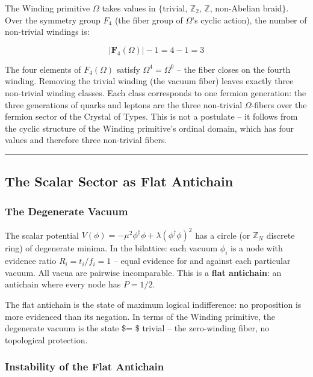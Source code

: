 The Winding primitive \(\Omega\) takes values in \(\{\)trivial,
\(\mathbb{Z}_2\), \(\mathbb{Z}\), non-Abelian braid\(\}\). Over the
symmetry group \(F_4\) (the fiber group of \(\Omega\)'s cyclic action),
the number of non-trivial windings is:

\[|\mathbf{F}_4(\Omega)| - 1 = 4 - 1 = 3\]

The four elements of \(F_4(\Omega)\) satisfy \(\Omega^4 = \Omega^0\) --
the fiber closes on the fourth winding. Removing the trivial winding
(the vacuum fiber) leaves exactly three non-trivial winding classes.
Each class corresponds to one fermion generation: the three generations
of quarks and leptons are the three non-trivial \(\Omega\)-fibers over
the fermion sector of the Crystal of Types. This is not a postulate --
it follows from the cyclic structure of the Winding primitive's ordinal
domain, which has four values and therefore three non-trivial fibers.

\begin{center}\rule{0.5\linewidth}{0.5pt}\end{center}

\hypertarget{the-scalar-sector-as-flat-antichain}{%
\subsection{The Scalar Sector as Flat
Antichain}\label{the-scalar-sector-as-flat-antichain}}

\hypertarget{the-degenerate-vacuum}{%
\subsubsection{The Degenerate Vacuum}\label{the-degenerate-vacuum}}

The scalar potential
\(V(\phi) = -\mu^2 \phi^\dagger \phi + \lambda(\phi^\dagger \phi)^2\)
has a circle (or \(\mathbb{Z}_N\) discrete ring) of degenerate minima.
In the bilattice: each vacuum \(\phi_i\) is a node with evidence ratio
\(R_i = t_i/f_i = 1\) -- equal evidence for and against each particular
vacuum. All vacua are pairwise incomparable. This is a \textbf{flat
antichain}: an antichain where every node has \(P = 1/2\).

The flat antichain is the state of maximum logical indifference: no
proposition is more evidenced than its negation. In terms of the Winding
primitive, the degenerate vacuum is the state \$\Omega = \$ trivial --
the zero-winding fiber, no topological protection.

\hypertarget{instability-of-the-flat-antichain}{%
\subsubsection{Instability of the Flat
Antichain}\label{instability-of-the-flat-antichain}}

